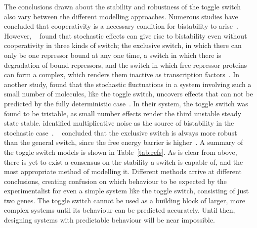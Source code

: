 The conclusions drawn about the stability and robustness of the toggle switch also vary between the different modelling approaches. Numerous studies have concluded that cooperativity is a necessary condition for bistability to arise~\autocite{Gardner:2000vha, Walczak:2005ds, Warren:2004baa, Warren:2005kea, Cherry:2000wi}. However, ~\textcite{Lipshtat:2006wb} found that stochastic effects can give rise to bistability even without cooperativity in three kinds of switch; the exclusive switch, in which there can only be one repressor bound at any one time, a switch in which there is degradation of bound repressors, and the switch in which free repressor proteins can form a complex, which renders them inactive as transcription factors~\autocite{Lipshtat:2006wb}. In another study, \textcite{Ma:2012dt} found that the stochastic fluctuations in a system involving such a small number of molecules, like the toggle switch, uncovers effects that can not be predicted by the fully deterministic case~\autocite{Ma:2012dt}. In their system, the toggle switch was found to be tristable, as small number effects render the third unstable steady state stable. \textcite{Biancalani:2015vya} identified multiplicative noise as the source of bistability in the stochastic case~\autocite{Biancalani:2015vya}. ~\textcite{Warren:2005kea} concluded that the exclusive switch is always more robust than the general switch, since the free energy barrier is higher~\autocite{Warren:2005kea}. A summary of the toggle switch models is shown in Table~\ref{tab:refs}. As is clear from above, there is yet to exist a consensus on the stability a switch is capable of, and the most appropriate method of modelling it. Different methods arrive at different conclusions, creating confusion on which behaviour to be expected by the experimentalist for even a simple system like the toggle switch, consisting of just two genes. The toggle switch cannot be used as a building block of larger, more complex systems until its behaviour can be predicted accurately. Until then, designing systems with predictable behaviour will be near impossible.


